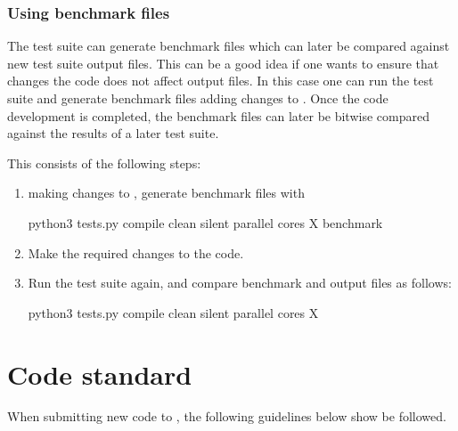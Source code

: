 \documentclass[letterpaper,10pt,english]{sphinxmanual}
\begin{document}
\subsubsection{Using benchmark files}
\label{\detokenize{Contrib/CI:using-benchmark-files}}
The test suite can generate benchmark files which can later be compared against new test suite output files.
This can be a good idea if one wants to ensure that changes the  code does not affect output files.
In this case one can run the test suite and generate benchmark files  adding changes to .
Once the code development is completed, the benchmark files can later be bit\sphinxhyphen{}wise compared against the results of a later test suite.

This consists of the following steps:
\begin{enumerate}
%
\item {} 
 making changes to , generate benchmark files with

\begin{sphinxVerbatim}[commandchars=\\\{\},formatcom=\scriptsize]
python3 tests.py \PYGZhy{}\PYGZhy{}compile \PYGZhy{}\PYGZhy{}clean \PYGZhy{}\PYGZhy{}silent \PYGZhy{}\PYGZhy{}parallel \PYGZhy{}cores X \PYGZhy{}\PYGZhy{}benchmark
\end{sphinxVerbatim}

\item {} 
Make the required changes to the  code.

\item {} 
Run the test suite again, and compare benchmark and output files as follows:

\begin{sphinxVerbatim}[commandchars=\\\{\},formatcom=\scriptsize]
python3 tests.py \PYGZhy{}\PYGZhy{}compile \PYGZhy{}\PYGZhy{}clean \PYGZhy{}\PYGZhy{}silent \PYGZhy{}\PYGZhy{}parallel \PYGZhy{}cores X
\end{sphinxVerbatim}

\end{enumerate}


\section{Code standard}
\label{\detokenize{Contrib/CodeStandard:code-standard}}\label{\detokenize{Contrib/CodeStandard:chap-codestandard}}\label{\detokenize{Contrib/CodeStandard::doc}}
When submitting new code to , the following guidelines below show be followed.
\end{document}
